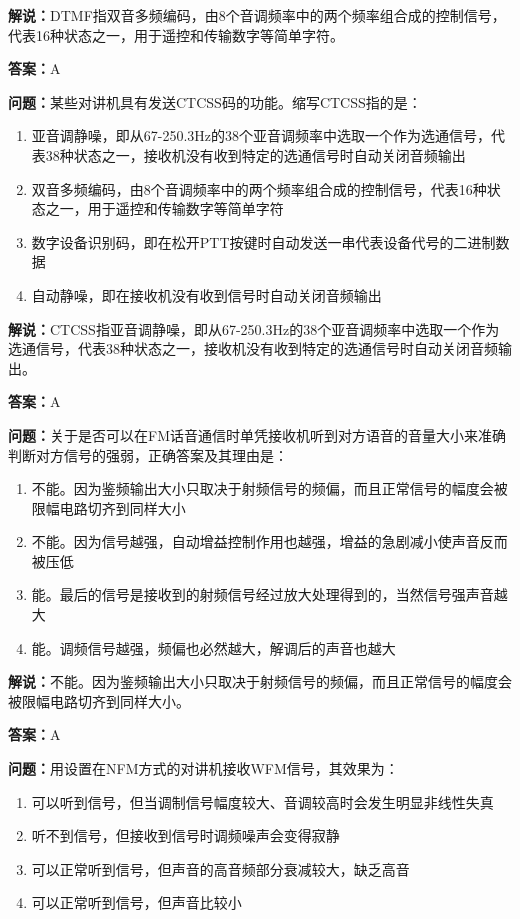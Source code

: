 \textbf{解说：}DTMF指双音多频编码，由8个音调频率中的两个频率组合成的控制信号，代表16种状态之一，用于遥控和传输数字等简单字符。%

\textbf{答案：}A

\textbf{问题：}某些对讲机具有发送CTCSS码的功能。缩写CTCSS指的是：

\begin{enumerate}[label=\Alph*), leftmargin=3em]
	\item 亚音调静噪，即从67-250.3Hz的38个亚音调频率中选取一个作为选通信号，代表38种状态之一，接收机没有收到特定的选通信号时自动关闭音频输出
	\item 双音多频编码，由8个音调频率中的两个频率组合成的控制信号，代表16种状态之一，用于遥控和传输数字等简单字符
	\item 数字设备识别码，即在松开PTT按键时自动发送一串代表设备代号的二进制数据
	\item 自动静噪，即在接收机没有收到信号时自动关闭音频输出
\end{enumerate}

\textbf{解说：}CTCSS指亚音调静噪，即从67-250.3Hz的38个亚音调频率中选取一个作为选通信号，代表38种状态之一，接收机没有收到特定的选通信号时自动关闭音频输出。%

\textbf{答案：}A

\textbf{问题：}关于是否可以在FM话音通信时单凭接收机听到对方语音的音量大小来准确判断对方信号的强弱，正确答案及其理由是：

\begin{enumerate}[label=\Alph*), leftmargin=3em]
	\item 不能。因为鉴频输出大小只取决于射频信号的频偏，而且正常信号的幅度会被限幅电路切齐到同样大小
	\item 不能。因为信号越强，自动增益控制作用也越强，增益的急剧减小使声音反而被压低
	\item 能。最后的信号是接收到的射频信号经过放大处理得到的，当然信号强声音越大
	\item 能。调频信号越强，频偏也必然越大，解调后的声音也越大
\end{enumerate}

\textbf{解说：}不能。因为鉴频输出大小只取决于射频信号的频偏，而且正常信号的幅度会被限幅电路切齐到同样大小。%

\textbf{答案：}A

\textbf{问题：}用设置在NFM方式的对讲机接收WFM信号，其效果为：

\begin{enumerate}[label=\Alph*), leftmargin=3em]
	\item 可以听到信号，但当调制信号幅度较大、音调较高时会发生明显非线性失真
	\item 听不到信号，但接收到信号时调频噪声会变得寂静
	\item 可以正常听到信号，但声音的高音频部分衰减较大，缺乏高音
	\item 可以正常听到信号，但声音比较小
\end{enumerate}

